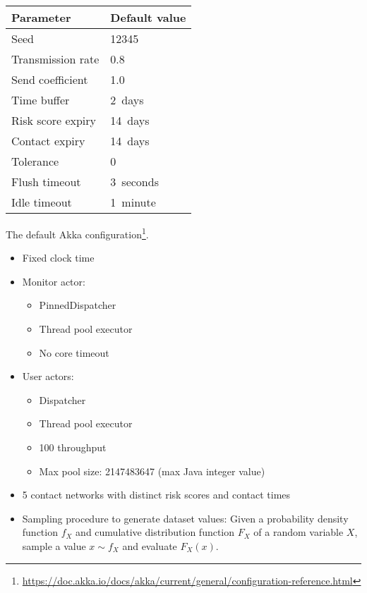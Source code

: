 \begin{table}
  \centering
  \begin{tabular}{ll}
    \toprule
    Parameter & Default value \\
    \midrule
    Seed & \num{12345} \\
    Transmission rate & \num{0.8} \\
    Send coefficient & \num{1.0} \\
    Time buffer & \qty{2}{days} \\
    Risk score expiry & \qty{14}{days} \\
    Contact expiry & \qty{14}{days} \\
    Tolerance & \num{0} \\
    Flush timeout & \qty{3}{seconds} \\
    Idle timeout & \qty{1}{minute} \\
    \bottomrule
  \end{tabular}
\end{table}

The default Akka configuration\footnote{\url{https://doc.akka.io/docs/akka/current/general/configuration-reference.html}}.

\begin{itemize}
  \item Fixed clock time
  \item Monitor actor:
    \begin{itemize}
      \item PinnedDispatcher
      \item Thread pool executor 
      \item No core timeout
    \end{itemize}
  \item User actors:
    \begin{itemize}
      \item Dispatcher
      \item Thread pool executor
      \item \num{100} throughput
      \item Max pool size: \num{2147483647} (max Java integer value)
    \end{itemize}
  \item 5 contact networks with distinct risk scores and contact times
  \item Sampling procedure to generate dataset values: Given a probability density function $f_X$ and cumulative distribution function $F_X$ of a random variable $X$, sample a value $x \sim f_X$ and evaluate $F_X(x)$.
\end{itemize}

